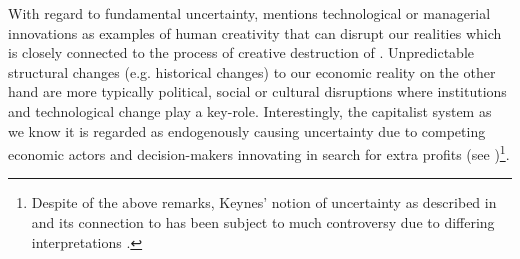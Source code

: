 \documentclass[a4paper,11pt,listof=nochaptergap,oneside,pointednumbers,bibtotoc,bigheadings,liststotoc,hidelinks]{scrbook}
\theoremstyle{mysatz}
\theoremstyle{mydefinition}
\theoremstyle{mytheorem}
\theoremstyle{mybemerkung}
\begin{document}
With regard to fundamental uncertainty, \citet{dequesh:00} mentions technological or managerial innovations as examples of human creativity that can disrupt our realities which is closely connected to the process of creative destruction of \citet{schumpeter:42}. Unpredictable structural changes (e.g. historical changes) to our economic reality on the other hand are more typically political, social or cultural disruptions where institutions and technological change play a key-role. Interestingly, the capitalist system as we know it is regarded as endogenously causing uncertainty due to competing economic actors and decision-makers innovating in search for extra profits (see \citealp{kregel:87})\footnote{Despite of the above remarks, Keynes' notion of uncertainty as described in \citet{keynes:21} and its connection to \citet{keynes:37} has been subject to much controversy due to differing interpretations \citep{dequesh:00}.}.
\end{document}
